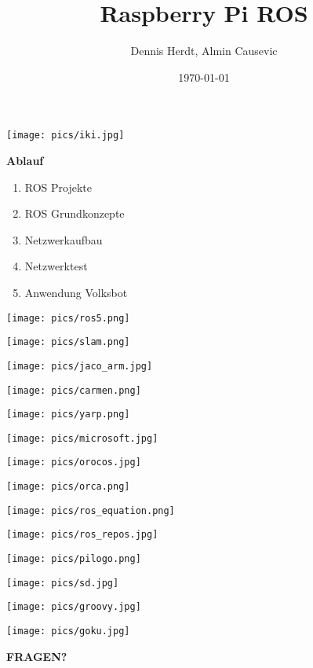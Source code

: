 \documentclass{beamer}
\title[Raspberry Pi ROS]{Raspberry Pi ROS}
\author{Dennis Herdt, Almin Causevic}
\institute[I_HS Wgt-Rav]{Angewandte Informatik HS Weingarten-Ravensburg}
\date{\today}
\begin{document}
\frame{\titlepage}

\begin{frame}
\centerline{\texttt{[image: pics/iki.jpg]}}
\end{frame}

\begin{frame}
{\bf Ablauf}
\begin{enumerate}
\item ROS Projekte
\item ROS Grundkonzepte
\item Netzwerkaufbau
\item Netzwerktest
\item Anwendung Volksbot
\end{enumerate}
\end{frame}

\begin{frame}
\centerline{\texttt{[image: pics/ros5.png]}}
\end{frame}

\begin{frame}
\centerline{\texttt{[image: pics/slam.png]}}
\end{frame}

\begin{frame}
\centerline{\texttt{[image: pics/jaco\_arm.jpg]}}
\end{frame}

\begin{frame}
\parbox{5cm}{\texttt{[image: pics/carmen.png]}}
\parbox{5cm}{\texttt{[image: pics/yarp.png]}}
\parbox{5cm}{\texttt{[image: pics/microsoft.jpg]}}
\hspace{5cm}
\parbox{5cm}{\texttt{[image: pics/orocos.jpg]}}
\parbox{5cm}{\texttt{[image: pics/orca.png]}}
\end{frame}

\begin{frame}
\centerline{\texttt{[image: pics/ros\_equation.png]}}
\end{frame}

\begin{frame}
\centerline{\texttt{[image: pics/ros\_repos.jpg]}}
\end{frame}


\begin{frame}
\parbox{5cm}{\texttt{[image: pics/pilogo.png]}}
\parbox{5cm}{\texttt{[image: pics/sd.jpg]}}
\end{frame}

\begin{frame}
\centerline{\texttt{[image: pics/groovy.jpg]}}
\end{frame}

\begin{frame}
\centerline{\texttt{[image: pics/goku.jpg]}}
\vspace{2cm}
\centerline{{\bf \Huge FRAGEN?}}
\end{frame}
\end{document}
